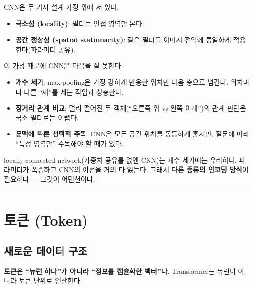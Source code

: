 \documentclass[
  korean,
]{article}
\providecommand{\tightlist}{%
  \setlength{\itemsep}{0pt}\setlength{\parskip}{0pt}}
\begin{document}
CNN은 두 가지 설계 가정 위에 서 있다.

\begin{itemize}
\tightlist
\item
  \textbf{국소성 (locality)}: 필터는 인접 영역만 본다.
\item
  \textbf{공간 정상성 (spatial stationarity)}: 같은 필터를 이미지 전역에
  동일하게 적용한다(파라미터 공유).
\end{itemize}

이 가정 때문에 CNN은 다음을 잘 못한다.

\begin{itemize}
\tightlist
\item
  \textbf{개수 세기}: max-pooling은 가장 강하게 반응한 위치만 다음
  층으로 넘긴다. 위치마다 다른 ``새''를 세는 작업과 상충한다.
\item
  \textbf{장거리 관계 비교}: 멀리 떨어진 두 객체(``오른쪽 위 vs 왼쪽
  아래'')의 관계 판단은 국소 필터로는 어렵다.
\item
  \textbf{문맥에 따른 선택적 주목}: CNN은 모든 공간 위치를 동등하게
  훑지만, 질문에 따라 ``특정 영역만'' 주목해야 할 때가 있다.
\end{itemize}

locally-connected network(가중치 공유를 없앤 CNN)는 개수 세기에는
유리하나, 파라미터가 폭증하고 CNN의 이점을 거의 다 잃는다. 그래서
\textbf{다른 종류의 인코딩 방식}이 필요하다 --- 그것이 어텐션이다.

\begin{center}\rule{0.5\linewidth}{0.5pt}\end{center}

\section{토큰 (Token)}\label{sec-token}

\subsection{새로운 데이터
구조}\label{uxc0c8uxb85cuxc6b4-uxb370uxc774uxd130-uxad6cuxc870}

\begin{tcolorbox}[enhanced jigsaw, arc=.35mm, bottomrule=.15mm, bottomtitle=1mm, breakable, colback=white, colbacktitle=quarto-callout-tip-color!10!white, colframe=quarto-callout-tip-color-frame, coltitle=black, left=2mm, leftrule=.75mm, opacityback=0, opacitybacktitle=0.6, rightrule=.15mm, title=\textcolor{quarto-callout-tip-color}{\faLightbulb}\hspace{0.5em}{핵심 한 줄}, titlerule=0mm, toprule=.15mm, toptitle=1mm]

\textbf{토큰은 ``뉴런 하나''가 아니라 ``정보를 캡슐화한 벡터''다.}
Transformer는 뉴런이 아니라 토큰 단위로 연산한다.

\end{tcolorbox}
\end{document}
